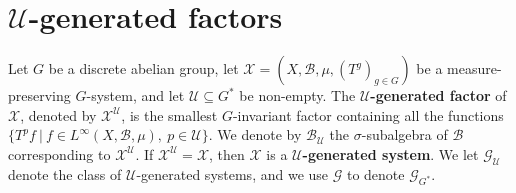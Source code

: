 \documentclass[graybox]{svmult}
\theoremstyle{definition}
\begin{document}


\section{$\mathcal U$-generated factors}\label{sec:ParreauFactors}
\begin{definition}\label{def:ParreauFactor}
    Let $G$ be a discrete abelian group, let $\mathcal{X} = (X,\mathscr{B},\mu,(T^g)_{g \in G})$ be a measure-preserving $G$-system, and let $\mathcal{U} \subseteq G^*$ be non-empty. 
    The \textbf{$\mathcal{U}$-generated factor} of $\mathcal{X}$, denoted by $\mathcal{X}^{\mathcal{U}}$, is the smallest $G$-invariant factor containing all the functions $\{T^pf\ |\ f \in L^\infty(X,\mathscr{B},\mu),\ p \in \mathcal{U}\}$.
    We denote by $\mathscr{B}_{\mathcal{U}}$  the $\sigma$-subalgebra of $\mathscr{B}$ corresponding to $\mathcal{X}^{\mathcal{U}}$.
    If $\mathcal{X}^{\mathcal{U}} = \mathcal{X}$, then $\mathcal{X}$ is a \textbf{$\mathcal{U}$-generated system}.
    We let $\mathcal{G}_\mathcal{U}$ denote the class of $\mathcal{U}$-generated systems, and we use $\mathcal{G}$ to denote $\mathcal{G}_{G^*}$.
\end{definition}
\end{document}
